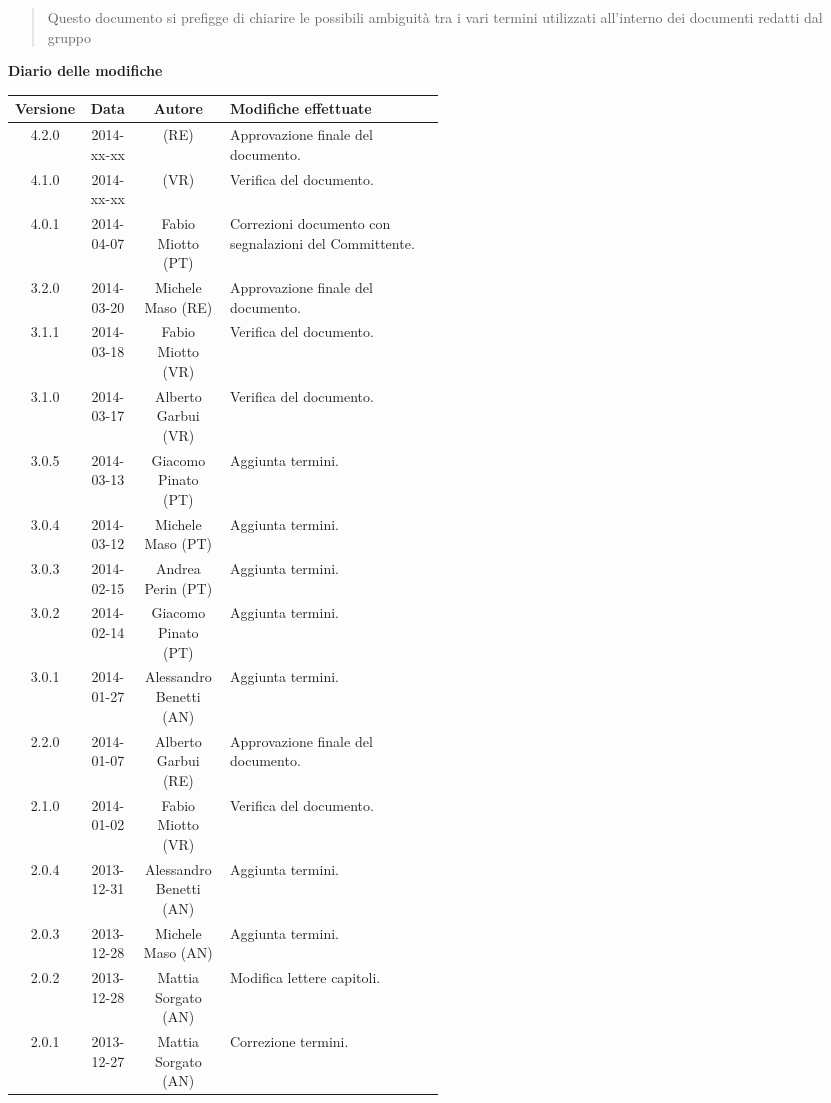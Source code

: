 \begin{abstract}
\begin{center}
Questo documento si prefigge di chiarire le possibili ambiguità tra i vari termini utilizzati all'interno dei documenti redatti dal gruppo \NomeGruppo{}
\end{center}
\end{abstract}

\newpage
\textbf{Diario delle modifiche}
\begin{center}
\begin{longtable}{|c|c|c|p{0.5\linewidth}|}
\toprule
\textbf{Versione} & \textbf{Data} & \textbf{Autore} & \textbf{Modifiche effettuate}\\

\midrule
4.2.0 & 2014-xx-xx &   (RE) & Approvazione finale del documento.\\
\midrule
4.1.0 & 2014-xx-xx &   (VR) & Verifica del documento. \\

\midrule
4.0.1 & 2014-04-07 & Fabio Miotto (PT) & Correzioni documento con segnalazioni del Committente.\\

\midrule
3.2.0 & 2014-03-20 & Michele Maso (RE) & Approvazione finale del documento.\\
\midrule
3.1.1 & 2014-03-18 & Fabio Miotto (VR) & Verifica del documento. \\
\midrule
3.1.0 & 2014-03-17 & Alberto Garbui (VR) & Verifica del documento. \\
\midrule
3.0.5 & 2014-03-13 & Giacomo Pinato (PT) & Aggiunta termini.\\
\midrule
3.0.4 & 2014-03-12 & Michele Maso (PT) & Aggiunta termini.\\
\midrule
3.0.3 & 2014-02-15 & Andrea Perin (PT) & Aggiunta termini.\\
\midrule
3.0.2 & 2014-02-14 & Giacomo Pinato (PT) & Aggiunta termini.\\
\midrule
3.0.1 & 2014-01-27 & Alessandro Benetti (AN) & Aggiunta termini.\\

\midrule
2.2.0 & 2014-01-07 & Alberto Garbui (RE) & Approvazione finale del documento.\\
\midrule
2.1.0 & 2014-01-02 & Fabio Miotto (VR) & Verifica del documento.\\
\midrule
2.0.4 & 2013-12-31 & Alessandro Benetti (AN) & Aggiunta termini.\\
\midrule
2.0.3 & 2013-12-28 & Michele Maso (AN) & Aggiunta termini.\\
\midrule
2.0.2 & 2013-12-28 & Mattia Sorgato (AN) & Modifica lettere capitoli.\\
\midrule
2.0.1 & 2013-12-27 & Mattia Sorgato (AN) & Correzione termini.\\


\end{longtable}
\end{center}
